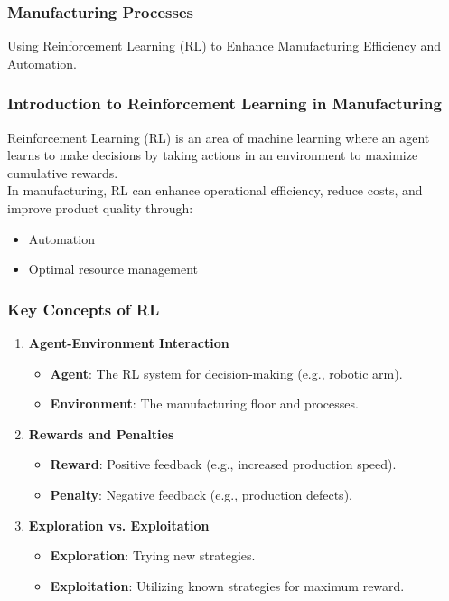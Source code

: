 \documentclass[aspectratio=169]{beamer}
\begin{document}
\begin{frame}
    \frametitle{Manufacturing Processes}
    Using Reinforcement Learning (RL) to Enhance Manufacturing Efficiency and Automation.
\end{frame}

\begin{frame}
    \frametitle{Introduction to Reinforcement Learning in Manufacturing}
    Reinforcement Learning (RL) is an area of machine learning where an agent learns to make decisions by taking actions in an environment to maximize cumulative rewards.\\[5pt]
    In manufacturing, RL can enhance operational efficiency, reduce costs, and improve product quality through:
    \begin{itemize}
        \item Automation
        \item Optimal resource management
    \end{itemize}
\end{frame}

\begin{frame}
    \frametitle{Key Concepts of RL}
    \begin{enumerate}
        \item \textbf{Agent-Environment Interaction}
            \begin{itemize}
                \item \textbf{Agent}: The RL system for decision-making (e.g., robotic arm).
                \item \textbf{Environment}: The manufacturing floor and processes.
            \end{itemize}
        
        \item \textbf{Rewards and Penalties}
            \begin{itemize}
                \item \textbf{Reward}: Positive feedback (e.g., increased production speed).
                \item \textbf{Penalty}: Negative feedback (e.g., production defects).
            \end{itemize}
        
        \item \textbf{Exploration vs. Exploitation}
            \begin{itemize}
                \item \textbf{Exploration}: Trying new strategies.
                \item \textbf{Exploitation}: Utilizing known strategies for maximum reward.
            \end{itemize}
    \end{enumerate}
\end{frame}
\end{document}
